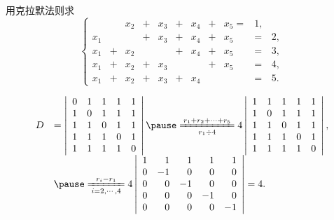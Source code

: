 \begin{frame}
  \begin{footnotesize}
    \begin{exampleblock}{32}
      用克拉默法则求
      $$
      \left\{
      \begin{array}{rcrcrcrcrcrc}
        &&x_2&+&x_3&+&x_4&+&x_5=&1,\\[0.1cm]
        x_1&&&+&x_3&+&x_4&+&x_5&=&2,\\[0.1cm]
        x_1&+&x_2&&&+&x_4&+&x_5&=&3,\\[0.1cm]
        x_1&+&x_2&+&x_3& & &+&x_5&=&4,\\[0.1cm]
        x_1&+&x_2&+& x_3&+&x_4&&&=&5.
      \end{array}
      \right.
      $$
    \end{exampleblock}
    \pause
    \jiename
    $$
    \begin{array}{rl}
      D &= \left|
      \begin{array}{rrrrr}
        0&1&1&1&1\\
        1&0&1&1&1\\
        1&1&0&1&1\\
        1&1&1&0&1\\
        1&1&1&1&0\\
      \end{array}
      \right|\pause
      \xlongequal[r_1\div 4]{r_1+r_2+\cd+r_5}
      4 \left|
      \begin{array}{rrrrr}
        1&1&1&1&1\\
        1&0&1&1&1\\
        1&1&0&1&1\\
        1&1&1&0&1\\
        1&1&1&1&0\\
      \end{array}
      \right| , \\[0.3in]
      & \pause\xlongequal[i=2,\cd, 4]{r_i-r_1}
      4 \left|
      \begin{array}{rrrrr}
        1&1&1&1&1\\
        0&-1&0&0&0\\
        0&0&-1&0&0\\
        0&0&0&-1&0\\
        0&0&0&0&-1\\
      \end{array}
      \right| = 4.
    \end{array}
    $$
  \end{footnotesize}
\end{frame}



